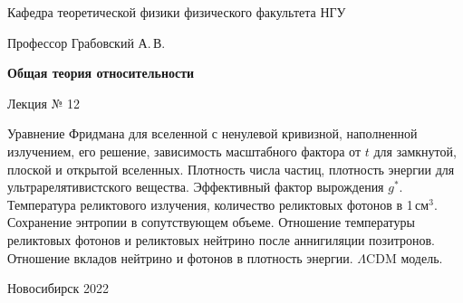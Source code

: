 \documentclass[12pt,pagesize,paper=192mm:108mm,landscape]{scrbook}
\begin{document}
\begin{titlepage}
\begin{center}
    Кафедра теоретической физики физического факультета НГУ

    \Large
    Профессор Грабовский А.\,В.

    \huge
    \textbf{Общая теория относительности}

    \Large
    Лекция № 12
    \vfill

    \normalsize
    \begin{minipage}{0.9\linewidth}
      Уравнение Фридмана для вселенной с ненулевой кривизной,
      наполненной излучением, его решение, зависимость масштабного
      фактора от $t$ для замкнутой, плоской и открытой
      вселенных. Плотность числа частиц, плотность энергии для
      ультрарелятивистского вещества. Эффективный фактор вырождения
      $g^{*}$. Температура реликтового излучения, количество
      реликтовых фотонов в 1\,см$^3$. Сохранение энтропии в сопутствующем
      объеме. Отношение температуры реликтовых фотонов и реликтовых
      нейтрино после аннигиляции позитронов. Отношение вкладов
      нейтрино и фотонов в плотность энергии. $\Lambda$CDM модель.
     \end{minipage}
    \vfill

    \normalsize \ccbysa\hspace{0.5em}  Новосибирск 2022
  \end{center}
\end{titlepage}
\end{document}
